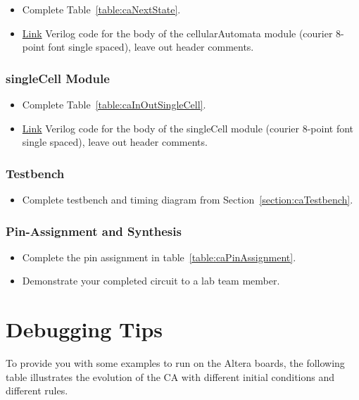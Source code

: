 \begin{itemize}
\item
  Complete Table~\ref{table:caNextState}.
\item
  \protect\hyperlink{cellularAutomata_verilog}{Link} Verilog code for
  the body of the cellularAutomata module (courier 8-point font single
  spaced), leave out header comments.
\end{itemize}

\subsubsection{singleCell Module}

\begin{itemize}
\item
  Complete Table~\ref{table:caInOutSingleCell}.
\item
  \protect\hyperlink{singleCell_verilog}{Link} Verilog code for the body
  of the singleCell module (courier 8-point font single spaced), leave
  out header comments.
\end{itemize}

\subsubsection{Testbench}
\begin{itemize}
\item Complete testbench and timing diagram from Section~\ref{section:caTestbench}.
\end{itemize}

\subsubsection{Pin-Assignment and Synthesis}
\begin{itemize}
\item Complete the pin assignment in table~\ref{table:caPinAssignment}.
\item Demonstrate your completed circuit to a lab team member.
\end{itemize}




\section{Debugging Tips}
\label{section:caDebugging}
To provide you with some examples to run on the Altera boards, the
following table illustrates the evolution of the CA with different
initial conditions and different rules.

